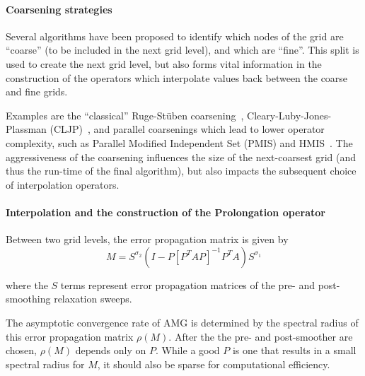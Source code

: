 \documentclass{svproc}
\begin{document}
\paragraph{Coarsening strategies}
Several algorithms have been proposed to identify which nodes of the grid are ``coarse'' (to be included in the next grid level), and which are ``fine''. This split is used to create the next grid level, but also forms vital information in the construction of the operators which interpolate values back between the coarse and fine grids.

Examples are the ``classical'' Ruge-St\"uben coarsening~\cite{AMGorginal}, Cleary-Luby-Jones-Plassman (CLJP)~\cite{cleary1998coarse}, and parallel coarsenings which lead to lower operator complexity, such as Parallel Modified Independent Set (PMIS) and HMIS~\cite{de2006reducing}. The aggressiveness of the coarsening influences the size of the next-coarsest grid (and thus the run-time of the final algorithm), but also impacts the subsequent choice of interpolation operators.

\paragraph{Interpolation and the construction of the Prolongation operator}
Between two grid levels, the error propagation matrix is given by
\begin{equation}
\label{eq:error-matrix}
M = S^{\sigma_2}(I - P[P^TAP]^{-1}P^TA)S^{\sigma_1}
\end{equation}

where the $S$ terms represent error propagation matrices of the pre- and post-smoothing relaxation sweeps.

The asymptotic convergence rate of AMG is determined by the spectral radius of this error propagation matrix $\rho(M)$. After the the pre- and post-smoother are chosen, $\rho(M)$ depends only on $P$. While a good $P$ is one that results in a small spectral radius for $M$, it should also be sparse for computational efficiency.

\end{document}
